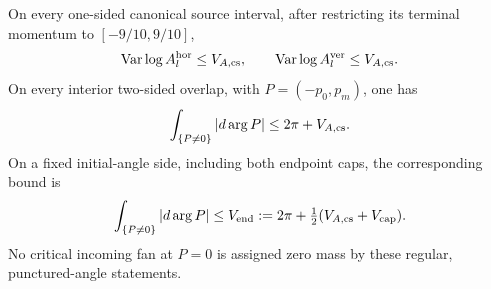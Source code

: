 \begin{lemma}
\label{lem:cs-turning}
On every one-sided canonical source interval, after restricting its
terminal momentum to $[-9/10,9/10]$,
\[
       \operatorname{Var}\log A_l^{\rm hor}\le V_{A,\rm cs},
       \qquad
       \operatorname{Var}\log A_l^{\rm ver}\le V_{A,\rm cs}.
\]
On every interior two-sided overlap, with $P=(-p_0,p_m)$, one has
\begin{equation}\label{eq:cs-turning}
             \int_{\{P\ne0\}}|d\arg P|
                             \le 2\pi+V_{A,\rm cs}.
\end{equation}
On a fixed initial-angle side, including both endpoint caps, the
corresponding bound is
\begin{equation}\label{eq:cs-end-turning}
          \int_{\{P\ne0\}}|d\arg P|
                 \le V_{\rm end}:=
                       2\pi+\tfrac12(V_{A,\rm cs}+V_{\rm cap}).
\end{equation}
No critical incoming fan at $P=0$ is assigned zero mass by these
regular, punctured-angle statements.
\end{lemma}
